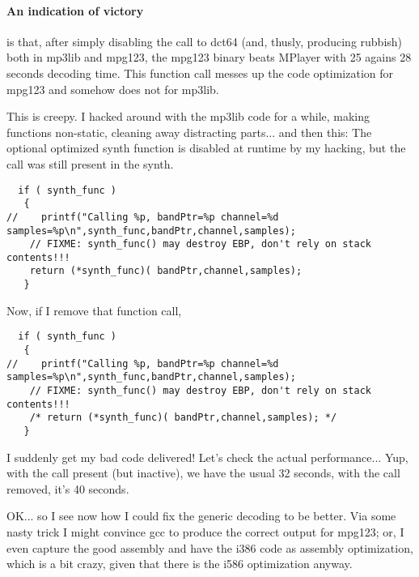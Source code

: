 \documentclass[a4paper,12pt]{scrartcl}
\begin{document}
\paragraph{An indication of victory}
is that, after simply disabling the call to dct64 (and, thusly, producing rubbish) both in mp3lib and mpg123, the mpg123 binary beats MPlayer with 25 agains 28 seconds decoding time.
This function call messes up the code optimization for mpg123 and somehow does not for mp3lib.

This is creepy. I hacked around with the mp3lib code for a while, making functions non-static, cleaning away distracting parts... and then this:
The optional optimized synth function is disabled at runtime by my hacking, but the call was still present in the synth.
\begin{verbatim}
  if ( synth_func )
   {
//    printf("Calling %p, bandPtr=%p channel=%d samples=%p\n",synth_func,bandPtr,channel,samples);
    // FIXME: synth_func() may destroy EBP, don't rely on stack contents!!!
    return (*synth_func)( bandPtr,channel,samples);
   }
\end{verbatim}
Now, if I remove that function call,
\begin{verbatim}
  if ( synth_func )
   {
//    printf("Calling %p, bandPtr=%p channel=%d samples=%p\n",synth_func,bandPtr,channel,samples);
    // FIXME: synth_func() may destroy EBP, don't rely on stack contents!!!
    /* return (*synth_func)( bandPtr,channel,samples); */
   }
\end{verbatim}
I suddenly get my bad code delivered! Let's check the actual performance... Yup, with the call present (but inactive), we have the usual 32 seconds, with the call removed, it's 40 seconds.

OK... so I see now how I could fix the generic decoding to be better. Via some nasty trick I might convince gcc to produce the correct output for mpg123; or, I even capture the good assembly and have the i386 code as assembly optimization, which is a bit crazy, given that there is the i586 optimization anyway.
\end{document}
